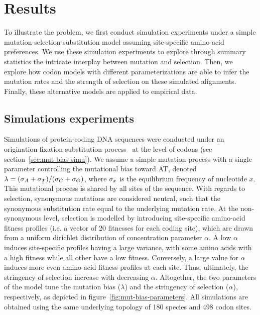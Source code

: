 \section{Results}
\label{sec:results}

To illustrate the problem, we first conduct simulation experiments under a simple mutation-selection substitution model assuming site-specific amino-acid preferences.
We use these simulation experiments to explore through summary statistics the intricate interplay between mutation and selection.
Then, we explore how codon models with different parameterizations are able to infer the mutation rates and the strength of selection on these simulated alignments.
Finally, these alternative models are applied to empirical data.

\subsection{Simulations experiments}
\label{subsec:simulations-experiments}

Simulations of protein-coding \acrshort{DNA} sequences were conducted under an origination-fixation substitution process~\citep{McCandlish2014} at the level of codons (see section~\ref{sec:mut-bias-simu}).
We assume a simple mutation process with a single parameter controlling the mutational bias toward AT, denoted $\lambda = (\sigma_A+\sigma_T)/(\sigma_C+\sigma_G)$, where $\sigma_x$ is the equilibrium frequency of nucleotide $x$.
This mutational process is shared by all sites of the sequence.
With regards to selection, synonymous mutations are considered neutral, such that the synonymous substitution rate equal to the underlying mutation rate.
At the non-synonymous level, selection is modelled by introducing site-specific amino-acid fitness profiles (i.e. a vector of 20 fitnesses for each coding site), which are drawn from a uniform dirichlet distribution of concentration parameter $\alpha$.
A low $\alpha$ induces site-specific profiles having a large variance, with some amino acids with a high fitness while all other have a low fitness.
Conversely, a large value for $\alpha$ induces more even amino-acid fitness profiles at each site.
Thus, ultimately, the stringency of selection increase with decreasing $\alpha$.
Altogether, the two parameters of the model tune the mutation bias ($\lambda$) and the stringency of selection ($\alpha$), respectively, as depicted in figure~\ref{fig:mut-bias-parameters}.
All simulations are obtained using the same underlying topology of 180 species and 498 codon sites.

